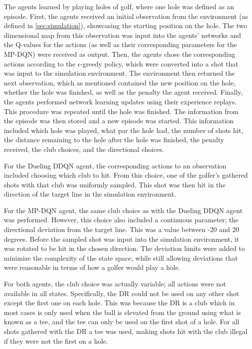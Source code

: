 \documentclass{kththesis}
\begin{document}
The agents learned by playing holes of golf, where one hole was defined as an episode. First, the agents received an initial observation from the environment (as defined in \autoref{sec:simulation}), showcasing the starting position on the hole. The two dimensional map from this observation was input into the agents' networks and the Q-values for the actions (as well as their corresponding parameters for the MP-DQN) were received as output. Then, the agents chose the corresponding actions according to the $\epsilon$-greedy policy, which were converted into a shot that was input to the simulation environment. The environment then returned the next observation, which as mentioned contained the new position on the hole, whether the hole was finished, as well as the penalty the agent received. Finally, the agents performed network learning updates using their experience replays. This procedure was repeated until the hole was finished. The information from the episode was then stored and a new episode was started. This information included which hole was played, what par the hole had, the number of shots hit, the distance remaining to the hole after the hole was finished, the penalty received, the club choices, and the directional choices.

For the Dueling DDQN agent, the corresponding actions to an observation included choosing which club to hit. From this choice, one of the golfer's gathered shots with that club was uniformly sampled. This shot was then hit in the direction of the target line in the simulation environment.

For the MP-DQN agent, the same club choice as with the Dueling DDQN agent was performed. However, this choice also included a continuous parameter; the directional deviation from the target line. This was a value between -20 and 20 degrees. Before the sampled shot was input into the simulation environment, it was rotated to be hit in the chosen direction. The deviation limits were added to minimize the complexity of the state space, while still allowing deviations that were reasonable in terms of how a golfer would play a hole.

For both agents, the club choice was actually variable; all actions were not available in all states. Specifically, the DR could not be used on any other shot except the first one on each hole. This was because the DR is a club which in most cases is only used when the ball is elevated from the ground using what is known as a tee, and the tee can only be used on the first shot of a hole. For all shots gathered with the DR a tee was used, making shots hit with the club illegal if they were not the first on a hole.
\end{document}
